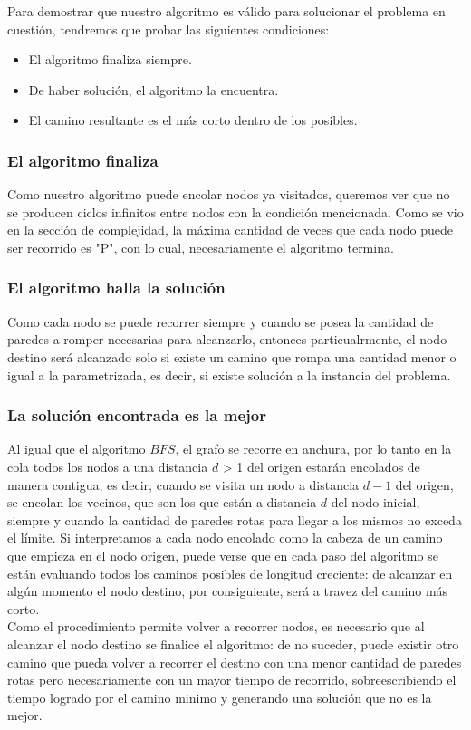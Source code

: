 Para demostrar que nuestro algoritmo es válido para solucionar el problema en cuesti\'on, tendremos que probar las siguientes condiciones:\\

\begin{itemize}
\item El algoritmo finaliza siempre.
\item De haber solución, el algoritmo la encuentra.
\item El camino resultante es el m\'as corto dentro de los posibles.
\end{itemize}

\subsubsection*{El algoritmo finaliza }
Como nuestro algoritmo puede encolar nodos ya visitados, queremos ver que no se producen ciclos infinitos entre nodos con la condici\'on mencionada. Como se vio en la sección de complejidad, la máxima cantidad de veces que cada nodo puede ser recorrido es "P", con lo cual, necesariamente el algoritmo termina.

\subsubsection*{El algoritmo halla la solución}

Como cada nodo se puede recorrer siempre y cuando se posea la cantidad de paredes a romper necesarias para alcanzarlo, entonces particualrmente, el nodo destino será alcanzado solo si existe un camino que rompa una cantidad menor o igual a la parametrizada, es decir, si existe solución a la instancia del problema. 

\subsubsection*{La soluci\'on encontrada es la mejor}

Al igual que el algoritmo $BFS$, el grafo se recorre en anchura, por lo tanto en la cola todos los nodos a una distancia $d$ > 1 del origen estarán encolados de manera contigua, es decir, cuando se visita un nodo a distancia $d-1$ del origen, se encolan los vecinos, que son los que están a distancia $d$ del nodo inicial, siempre y cuando la cantidad de paredes rotas para llegar a los mismos no exceda el l\'imite. Si interpretamos a cada nodo encolado como la cabeza de un camino que empieza en el nodo origen, puede verse que en cada paso del algoritmo se están evaluando todos los caminos posibles de longitud creciente: de alcanzar en algún momento el nodo destino, por consiguiente, será a travez del camino más corto.\\

Como el procedimiento permite volver a recorrer nodos, es necesario que al alcanzar el nodo destino se finalice el algoritmo: de no suceder, puede existir otro camino que pueda volver a recorrer el destino con una menor cantidad de paredes rotas pero necesariamente con un mayor tiempo de recorrido, sobreescribiendo el tiempo logrado por el camino minimo y generando una solución que no es la mejor.



